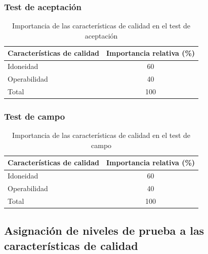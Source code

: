 \documentclass[
11pt, %
codirector, %
]{simple_charter}
\begin{document}
\subsubsection{Test de aceptación}
\label{sssec:test-de-aceptacion}

\begin{table}[H]
\centering
\begin{tabular}{@{}lc@{}}
\toprule
\textbf{Características de calidad} & \textbf{Importancia relativa (\%)} \\ \midrule
Idoneidad                           & 60                                 \\
Operabilidad                        & 40                                 \\
Total                               & 100                                \\ \bottomrule
\end{tabular}
\caption{Importancia de las características de calidad en el test de aceptación}
\label{tab:ir-test-accept}
\end{table}

\subsubsection{Test de campo}
\label{sssec:test-de-campo}

\begin{table}[H]
\centering
\begin{tabular}{@{}lc@{}}
\toprule
\textbf{Características de calidad} & \textbf{Importancia relativa (\%)} \\ \midrule
Idoneidad                           & 60                                 \\
Operabilidad                        & 40                                 \\
Total                               & 100                                \\ \bottomrule
\end{tabular}
\caption{Importancia de las características de calidad en el test de campo}
\label{tab:ir-test-field}
\end{table}

\subsection{Asignación de niveles de prueba a las características de calidad}
\label{ssec:asignacion-de-niveles-de-prueba-a-las-caracteristicas-de-calidad}
\end{document}
